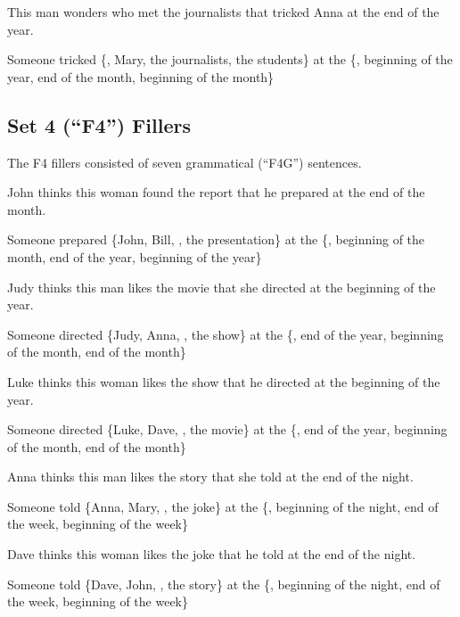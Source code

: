 \pex %
\a[label=S] This man wonders who met the journalists that tricked Anna at the end of the year.\par\nobreak
\a[label=Q] Someone tricked \{, Mary, the journalists, the students\} at the \{, beginning of the year, end of the month, beginning of the month\}
\xe

\subsection{Set 4 (``F4'') Fillers}

\vspace{0.2cm}

The F4 fillers consisted of seven grammatical (``F4G'') sentences.

\vspace{0.2cm}

\pex %
\a[label=S] John thinks this woman found the report that he prepared at the end of the month.\par\nobreak
\a[label=Q] Someone prepared \{John, Bill, , the presentation\} at the \{, beginning of the month, end of the year, beginning of the year\}
\xe

\pex %
\a[label=S] Judy thinks this man likes the movie that she directed at the beginning of the year.\par\nobreak
\a[label=Q] Someone directed \{Judy, Anna, , the show\} at the \{, end of the year, beginning of the month, end of the month\}
\xe

\pex %
\a[label=S] Luke thinks this woman likes the show that he directed at the beginning of the year.\par\nobreak
\a[label=Q] Someone directed \{Luke, Dave, , the movie\} at the \{, end of the year, beginning of the month, end of the month\}
\xe

\pex %
\a[label=S] Anna thinks this man likes the story that she told at the end of the night.\par\nobreak
\a[label=Q] Someone told \{Anna, Mary, , the joke\} at the \{, beginning of the night, end of the week, beginning of the week\}
\xe

\pex %
\a[label=S] Dave thinks this woman likes the joke that he told at the end of the night.\par\nobreak
\a[label=Q] Someone told \{Dave, John, , the story\} at the \{, beginning of the night, end of the week, beginning of the week\}
\xe

